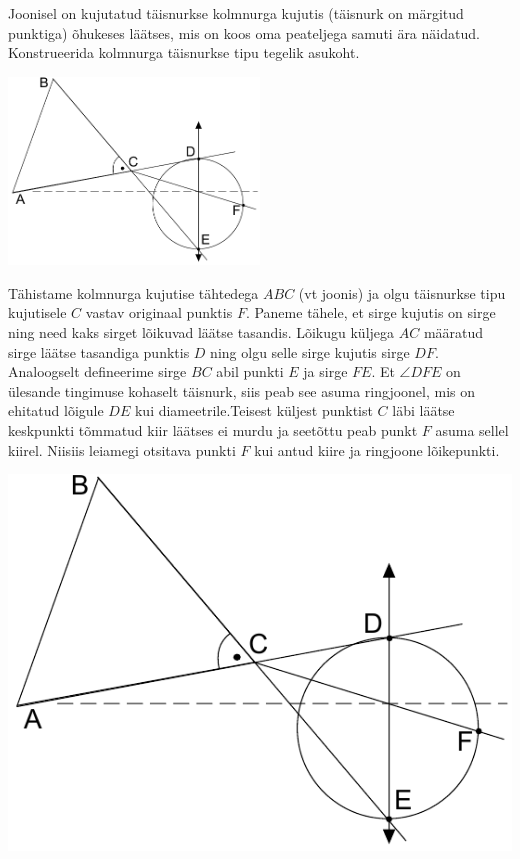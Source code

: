 
Joonisel on kujutatud täisnurkse kolmnurga kujutis (täisnurk on märgitud punktiga) õhukeses läätses, mis on koos oma peateljega samuti ära näidatud. Konstrueerida kolmnurga täisnurkse tipu tegelik asukoht.
\begin{center}
	\includegraphics[width = 0.5\textwidth]{2018-lahg-08-yl.pdf}
\end{center}\hint

\solu
Tähistame kolmnurga kujutise tähtedega $ABC$ (vt joonis) ja olgu täisnurkse tipu kujutisele $C$ vastav originaal punktis $F$. Paneme tähele, et sirge kujutis on sirge ning need kaks sirget lõikuvad läätse tasandis. Lõikugu küljega $AC$ määratud sirge läätse tasandiga punktis $D$ ning olgu selle sirge kujutis sirge $DF$. Analoogselt defineerime sirge 
$BC$ abil punkti $E$ ja sirge $FE$. Et $\angle DFE$ on ülesande tingimuse kohaselt täisnurk, siis peab see asuma ringjoonel, mis on ehitatud lõigule $DE$ kui diameetrile.Teisest küljest punktist $C$ läbi läätse keskpunkti tõmmatud kiir läätses ei murdu ja seetõttu peab punkt $F$ asuma sellel kiirel. Niisiis leiamegi otsitava punkti $F$ kui antud kiire ja ringjoone lõikepunkti.
\begin{center}
	\includegraphics[width=0.5\linewidth]{2018-lahg-08-yl.pdf}
\end{center}\probend